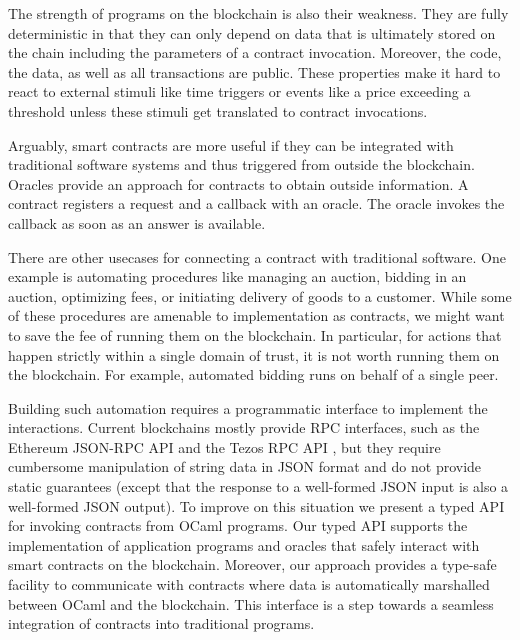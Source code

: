 \documentclass[runningheads]{llncs}
\begin{document}
The strength of programs on the blockchain is also their
weakness. They are fully deterministic in that they can only depend on
data that is ultimately stored on the chain including the parameters
of a contract invocation. Moreover, the code, the data, as well as all
transactions are public. These properties make it hard to react to
external stimuli like time triggers or events like a price exceeding a
threshold unless these stimuli get translated to
contract invocations. 

Arguably, smart contracts are more useful if they can be
integrated with traditional software systems and thus triggered from
outside the blockchain.  Oracles
\cite{oracle-patterns,call-action-oracle} provide an approach for
contracts to obtain outside information. A contract registers a
request and a callback with an oracle. The oracle invokes the callback
as soon as an answer is available. %

There are other usecases for connecting a contract with traditional software. One example is
automating procedures like managing an auction,  bidding in
an auction, optimizing fees, or initiating delivery of goods to a
customer. While some of these procedures are amenable to
implementation as contracts, we might want to save the fee of running
them on the blockchain. In particular, for actions that happen
strictly within a single domain of trust, it is not worth running them
on the blockchain. For example, automated bidding runs on behalf of
a single peer.

Building such automation requires a programmatic interface to implement the interactions. 
Current blockchains mostly provide RPC interfaces, 
such as the Ethereum JSON-RPC API \cite{ethereum-rpc} and the Tezos RPC API \cite{tezos-whitepaper}, but they
require cumbersome manipulation of string data in JSON format and do
not provide static guarantees (except that the response to a
well-formed JSON input is also a well-formed JSON output). 
To improve on this situation
we present a typed API for invoking contracts from OCaml programs. 
Our typed API supports the implementation of application programs and oracles 
that safely interact with smart contracts on the blockchain. 
Moreover, our approach provides a type-safe facility to communicate
with contracts where data is automatically marshalled between OCaml
and the blockchain. This interface is a step towards a seamless
integration of contracts into traditional programs.
\end{document}
